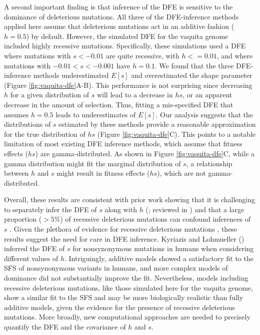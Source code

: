 \documentclass[hidelinks]{article}
\begin{document}
    A second important finding is that inference of the DFE
    is sensitive to the dominance of deleterious mutations.
    All three of the DFE-inference methods applied here assume that deleterious mutations act
    in an additive fashion ($h=0.5$) by default.
    However, the simulated DFE for the vaquita genome included highly recessive mutations.
    Specifically, these simulations used a DFE where mutations with $s<-0.01$ are quite recessive,
    with $h<=0.01$, and where mutations with $-0.01<s<-0.001$ have $h=0.1$.
    We found that the three DFE-inference methods underestimated $E[s]$ and overestimated the shape parameter (Figure \ref{fig:vaquita-dfe}A-B).
    This performance is not surprising since decreasing $h$ for a given distribution of $s$ will lead to a decrease in $hs$,
    or an apparent decrease in the amount of selection.
    Thus, fitting a mis-specified DFE that assumes $h=0.5$ leads to underestimates of $E[s]$. 
    Our analysis suggests that the distributions of $s$ estimated by these methods
    provide a reasonable approximation for the true distribution of $hs$ (Figure \ref{fig:vaquita-dfe}C).
    This points to a notable limitation of most existing DFE inference methods,
    which assume that fitness effects ($hs$) are gamma-distributed.
    As shown in Figure \ref{fig:vaquita-dfe}C,
    while a gamma distribution might fit the marginal distribution of $s$,
    a relationship between $h$ and $s$ might result in fitness effects ($hs$),
    which are not gamma-distributed.
    
    Overall, these results are consistent with prior work showing that it is challenging to separately
    infer the DFE of $s$ along with $h$ (\textcite{wright1937distribution, veeramah2014evidence, simons2014deleterious, fuller2019measuring, balick2022overcoming, kyriazis2024constraining}; reviewed in \textcite{fuller2019measuring}) 
    and that a large proportion ($>5\%$) of recessive deleterious mutations can confound inferences of $s$ \citep{wade2023quantifying}.
    Given the plethora of evidence for recessive deleterious mutations
    \citep{mukai1972mutation, agrawal2011inferences, huber2018gene, di2024revisiting},
    these results suggest the need for care in DFE inference.
    Kyriazis and Lohmueller (\citeyear{kyriazis2024constraining}) inferred the DFE of $s$ for nonsynonymous mutations
    in humans when considering different values of $h$.
    Intriguingly, additive models showed a satisfactory fit to the SFS of nonsynonymous variants in humans,
    and more complex models of dominance did not substantially improve the fit.
    Nevertheless, models including recessive deleterious mutations, like those simulated here for the vaquita genome,
    show a similar fit to the SFS and may be more biologically realistic than fully additive models, 
    given the evidence for the presence of recessive deleterious mutations.
    More broadly, new computational approaches are needed to precisely quantify the DFE and the covariance of $h$ and $s$.
\end{document}
